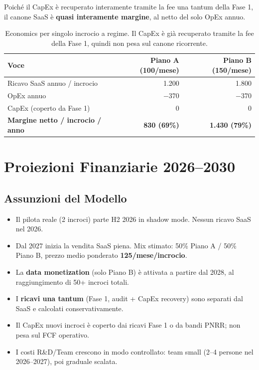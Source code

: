 \documentclass[a4paper,11pt]{article}
\begin{document}
Poiché il CapEx è recuperato interamente tramite la fee una tantum della Fase 1,
il canone SaaS è \textbf{quasi interamente margine}, al netto del solo OpEx annuo.

\begin{table}[h!]
\centering
\renewcommand{\arraystretch}{1.3}
\begin{tabular}{l r r}
\toprule
\textbf{Voce} & \textbf{Piano A (\texteuro{}100/mese)} & \textbf{Piano B (\texteuro{}150/mese)} \\
\midrule
Ricavo SaaS annuo / incrocio          & \texteuro{}1.200 & \texteuro{}1.800 \\
OpEx annuo                            & $-$\texteuro{}370 & $-$\texteuro{}370 \\
CapEx (coperto da Fase 1)             & \texteuro{}0     & \texteuro{}0     \\
\midrule
\textbf{Margine netto / incrocio / anno} & \textbf{\texteuro{}830 (69\%)} & \textbf{\texteuro{}1.430 (79\%)} \\
\bottomrule
\end{tabular}
\caption{Economics per singolo incrocio a regime. Il CapEx è già recuperato tramite la fee della Fase 1, quindi non pesa sul canone ricorrente.}
\end{table}

\section{Proiezioni Finanziarie 2026--2030}

\subsection{Assunzioni del Modello}

\begin{itemize}[nosep, topsep=4pt]
    \item Il pilota reale (2 incroci) parte H2 2026 in shadow mode. Nessun ricavo SaaS nel 2026.
    \item Dal 2027 inizia la vendita SaaS piena. Mix stimato: 50\% Piano A / 50\% Piano B, prezzo medio ponderato \textbf{\texteuro{}125/mese/incrocio}.
    \item La \textbf{data monetization} (solo Piano B) è attivata a partire dal 2028, al raggiungimento di 50+ incroci totali.
    \item I \textbf{ricavi una tantum} (Fase 1, audit + CapEx recovery) sono separati dal SaaS e calcolati conservativamente.
    \item Il CapEx nuovi incroci è coperto dai ricavi Fase 1 o da bandi PNRR; non pesa sul FCF operativo.
    \item I costi R\&D/Team crescono in modo controllato: team small (2--4 persone nel 2026--2027), poi graduale scalata.
\end{itemize}
\end{document}
